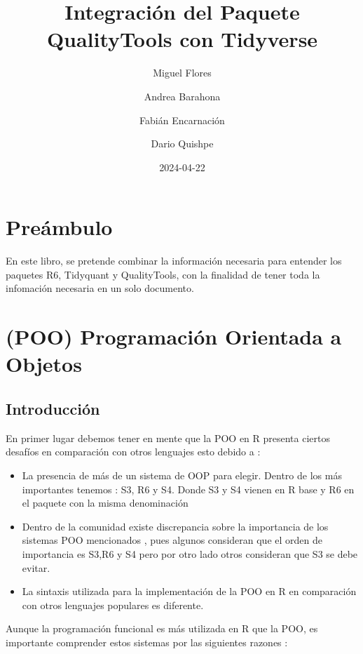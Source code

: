 \documentclass[
]{book}
\title{Integración del Paquete QualityTools con Tidyverse}
\author{Miguel Flores \and Andrea Barahona \and Fabián Encarnación \and Dario Quishpe}
\date{2024-04-22}
\begin{document}
\maketitle

{
\setcounter{tocdepth}{1}
\tableofcontents
}
\hypertarget{preuxe1mbulo}{%
\chapter{Preámbulo}\label{preuxe1mbulo}}

En este libro, se pretende combinar la información necesaria para entender los paquetes R6, Tidyquant y QualityTools, con la finalidad de tener toda la infomación necesaria en un solo documento.

\hypertarget{poo-programaciuxf3n-orientada-a-objetos}{%
\chapter{(POO) Programación Orientada a Objetos}\label{poo-programaciuxf3n-orientada-a-objetos}}

\hypertarget{introducciuxf3n}{%
\section{Introducción}\label{introducciuxf3n}}

En primer lugar debemos tener en mente que la POO en R presenta ciertos desafíos en comparación con otros lenguajes esto debido a :

\begin{itemize}
\item
  La presencia de más de un sistema de OOP para elegir. Dentro de los más importantes tenemos : S3, R6 y S4. Donde S3 y S4 vienen en R base y R6 en el paquete con la misma denominación
\item
  Dentro de la comunidad existe discrepancia sobre la importancia de los sistemas POO mencionados , pues algunos consideran que el orden de importancia es S3,R6 y S4 pero por otro lado otros consideran que S3 se debe evitar.
\item
  La sintaxis utilizada para la implementación de la POO en R en comparación con otros lenguajes populares es diferente.
\end{itemize}

Aunque la programación funcional es más utilizada en R que la POO, es importante comprender estos sistemas por las siguientes razones :
\end{document}
